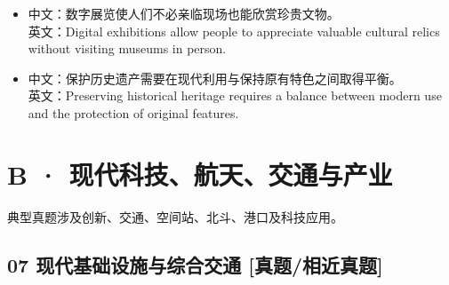 \documentclass[a4paper,11pt,UTF8,fontset=none]{ctexart}
\begin{document}
\begin{itemize}[leftmargin=1.7em,itemsep=1pt,parsep=0pt,topsep=2pt]
\item \noindent 中文：数字展览使人们不必亲临现场也能欣赏珍贵文物。\\ 英文：Digital exhibitions allow people to appreciate valuable cultural relics without visiting museums in person.\par


\item \noindent 中文：保护历史遗产需要在现代利用与保持原有特色之间取得平衡。\\ 英文：Preserving historical heritage requires a balance between modern use and the protection of original features.\par


\end{itemize}

\section{B · 现代科技、航天、交通与产业}

\noindent 典型真题涉及创新、交通、空间站、北斗、港口及科技应用。\par

\subsection{07 现代基础设施与综合交通 {\color{AccentBlue} [真题/相近真题]}}
\end{document}
